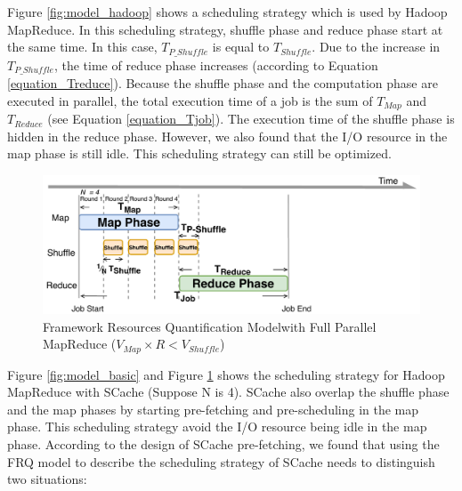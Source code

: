 {Figure \ref{fig:model_hadoop} shows a scheduling strategy which is used by Hadoop MapReduce. In this scheduling strategy, shuffle phase and reduce phase start at the same time. In this case, \(T_{P\_Shuffle}\) is equal to \(T_{Shuffle}\). Due to the increase in \(T_{P\_Shuffle}\), the time of reduce phase increases (according to Equation \ref{equation_Treduce}). Because the shuffle phase and the computation phase are executed in parallel, the total execution time of a job is the sum of \(T_{Map}\) and \(T_{Reduce}\) (see Equation \ref{equation_Tjob}). The execution time of the shuffle phase is hidden in the reduce phase. 
However, we also found that the I/O resource in the map phase is still idle. This scheduling strategy can still be optimized.

\begin{figure}
	\centering
	\includegraphics[width=\linewidth]{fig/model_scache2}
	\caption{\color{black}Framework Resources Quantification Model\newline with Full Parallel MapReduce (\(V_{Map} \times R < V_{Shuffle}\))}
	\label{fig:model_scache2}
\end{figure}

Figure \ref{fig:model_basic} and Figure \ref{fig:model_scache2} shows the scheduling strategy for Hadoop MapReduce with SCache (Suppose N is 4).
SCache also overlap the shuffle phase and the map phases by starting pre-fetching and pre-scheduling in the map phase.
This scheduling strategy avoid the I/O resource being idle in the map phase.
According to the design of SCache pre-fetching, we found that using the FRQ model to describe the scheduling strategy of SCache needs to distinguish two situations:

}
